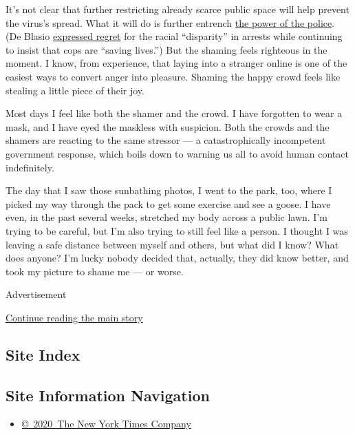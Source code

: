 It's not clear that further restricting already scarce public space will
help prevent the virus's spread. What it will do is further entrench
\href{https://time.com/5832403/nypd-pandemic-police-social-distancing-arrests/}{the
power of the police}. (De Blasio
\href{https://twitter.com/NYCMayor/status/1258581714877722630}{expressed
regret} for the racial ``disparity'' in arrests while continuing to
insist that cops are ``saving lives.'') But the shaming feels righteous
in the moment. I know, from experience, that laying into a stranger
online is one of the easiest ways to convert anger into pleasure.
Shaming the happy crowd feels like stealing a little piece of their joy.

Most days I feel like both the shamer and the crowd. I have forgotten to
wear a mask, and I have eyed the maskless with suspicion. Both the
crowds and the shamers are reacting to the same stressor --- a
catastrophically incompetent government response, which boils down to
warning us all to avoid human contact indefinitely.

The day that I saw those sunbathing photos, I went to the park, too,
where I picked my way through the pack to get some exercise and see a
goose. I have even, in the past several weeks, stretched my body across
a public lawn. I'm trying to be careful, but I'm also trying to still
feel like a person. I thought I was leaving a safe distance between
myself and others, but what did I know? What does anyone? I'm lucky
nobody decided that, actually, they did know better, and took my picture
to shame me --- or worse.

Advertisement

\protect\hyperlink{after-bottom}{Continue reading the main story}

\hypertarget{site-index}{%
\subsection{Site Index}\label{site-index}}

\hypertarget{site-information-navigation}{%
\subsection{Site Information
Navigation}\label{site-information-navigation}}

\begin{itemize}
\tightlist
\item
  \href{https://help.nytimes3xbfgragh.onion/hc/en-us/articles/115014792127-Copyright-notice}{©~2020~The
  New York Times Company}
\end{itemize}

